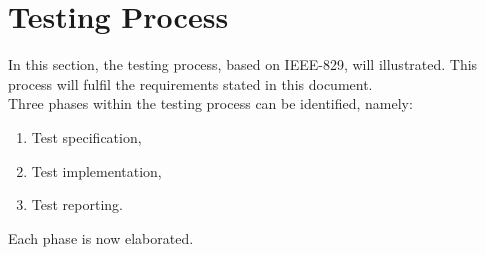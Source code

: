 \documentclass[12pt]{article}
\begin{document}
\newpage
{}
\tableofcontents
\newpage
\listoffigures

\newpage
{}
  

\section{Testing Process}
In this section, the testing process, based on IEEE-829, will illustrated. This process will fulfil the requirements stated in this document.\\
\indent Three phases within the testing process can be identified, namely:
\begin{enumerate}
	\item Test specification,
	\item Test implementation,
	\item Test reporting.
\end{enumerate}
Each phase is now elaborated.
\end{document}
